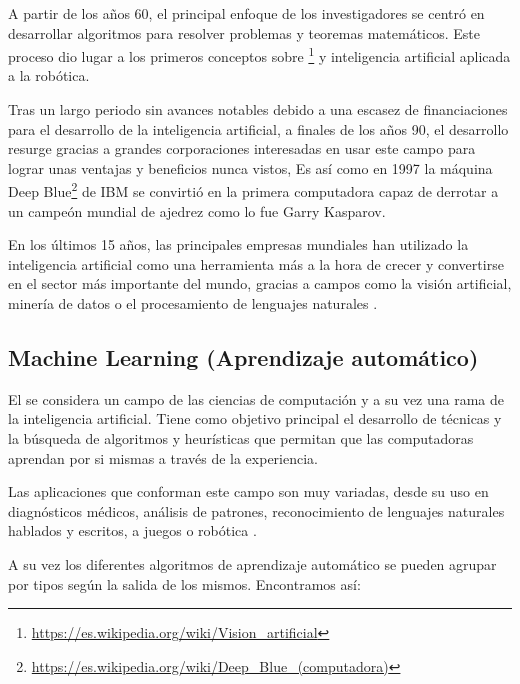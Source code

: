 A partir de los años 60, el principal enfoque de los investigadores se centró en desarrollar algoritmos para resolver problemas y teoremas matemáticos. Este proceso dio lugar a los primeros conceptos sobre \footnote{\url{https://es.wikipedia.org/wiki/Vision\_artificial}} y inteligencia artificial aplicada a la robótica.

Tras un largo periodo sin avances notables debido a una escasez de financiaciones para el desarrollo de la inteligencia artificial, a finales de los años 90, el desarrollo resurge gracias a grandes corporaciones interesadas en usar este campo para lograr unas ventajas y beneficios nunca vistos, Es así como en 1997 la máquina Deep Blue\footnote{\url{https://es.wikipedia.org/wiki/Deep_Blue_(computadora)}} de IBM se convirtió en la primera computadora capaz de derrotar a un campeón mundial de ajedrez como lo fue Garry Kasparov.

En los últimos 15 años, las principales empresas mundiales han utilizado la inteligencia artificial como una herramienta más a la hora de crecer y convertirse en el sector más importante del mundo, gracias a campos como la visión artificial, minería de datos o el procesamiento de lenguajes naturales \cite{aihistory}.

\subsection{Machine Learning (Aprendizaje automático)}
El  se considera un campo de las ciencias de computación y a su vez una rama de la inteligencia artificial. Tiene como objetivo principal el desarrollo de técnicas y la búsqueda de algoritmos y heurísticas que permitan que las computadoras aprendan por si mismas a través de la experiencia.

Las aplicaciones que conforman este campo son muy variadas, desde su uso en diagnósticos médicos, análisis de patrones, reconocimiento de lenguajes naturales hablados y escritos, a juegos o robótica \cite{wiki:apredizaje_automatico}.

A su vez los diferentes algoritmos de aprendizaje automático se pueden agrupar por tipos según la salida de los mismos.
Encontramos así:

